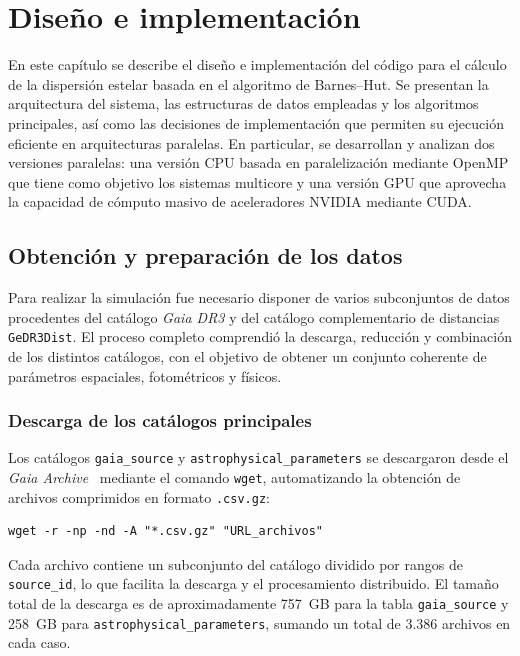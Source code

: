 \chapter{Diseño e implementación}
\label{chap:diseno}
En este capítulo se describe el diseño e implementación del código para el cálculo de la dispersión estelar basada en el algoritmo de Barnes–Hut.
Se presentan la arquitectura del sistema, las estructuras de datos empleadas y los algoritmos principales, así como las decisiones de implementación que permiten su ejecución eficiente en arquitecturas paralelas.
En particular, se desarrollan y analizan dos versiones paralelas: una versión CPU basada en paralelización mediante OpenMP que tiene como objetivo los sistemas  multicore y una versión GPU que aprovecha la capacidad de cómputo masivo de aceleradores NVIDIA mediante CUDA\@.

\section{Obtención y preparación de los datos}\label{sec:datos}

Para realizar la simulación fue necesario disponer de varios subconjuntos de datos procedentes del catálogo \textit{Gaia DR3} y del catálogo complementario de distancias \texttt{GeDR3Dist}.
El proceso completo comprendió la descarga, reducción y combinación de los distintos catálogos, con el objetivo de obtener un conjunto coherente de parámetros espaciales, fotométricos y físicos.

\subsection*{Descarga de los catálogos principales}

Los catálogos \texttt{gaia\_source} y \texttt{astrophysical\_parameters} se descargaron desde el \textit{Gaia Archive}~\cite{gaia_archive} mediante el comando \texttt{wget}, automatizando la obtención de archivos comprimidos en formato \texttt{.csv.gz}:

\begin{verbatim}
wget -r -np -nd -A "*.csv.gz" "URL_archivos"
\end{verbatim}

Cada archivo contiene un subconjunto del catálogo dividido por rangos de \texttt{source\_id}, lo que facilita la descarga y el procesamiento distribuido.
El tamaño total de la descarga es de aproximadamente 757~GB para la tabla \texttt{gaia\_source} y 258~GB para \texttt{astrophysical\_}\allowbreak\texttt{parameters}, sumando un total de 3.386 archivos en cada caso.
